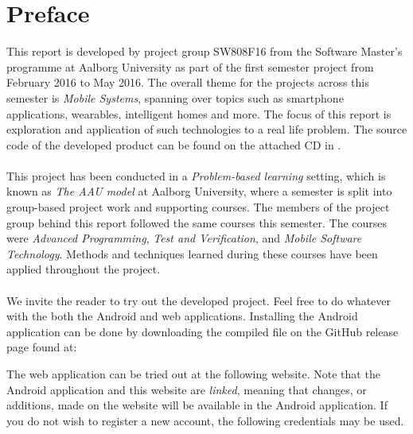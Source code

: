 
\chapter*{Preface}
This report is developed by project group SW808F16 from the Software Master's programme at Aalborg University as part of the first semester project from February 2016 to May 2016. The overall theme for the projects across this semester is \emph{Mobile Systems}, spanning over topics such as smartphone applications, wearables, intelligent homes and more. The focus of this report is exploration and application of such technologies to a real life problem. The source code of the developed product can be found on the attached CD in .
\\\\
This project has been conducted in a \emph{Problem-based learning} setting, which is known as \emph{The AAU model} at Aalborg University, where a semester is split into group-based project work and supporting courses. The members of the project group behind this report followed the same courses this semester. The courses were \emph{Advanced Programming}, \emph{Test and Verification}, and \emph{Mobile Software Technology}. Methods and techniques learned during these courses have been applied throughout the project.
\\\\
We invite the reader to try out the developed project. Feel free to do whatever with the both the Android and web applications. Installing the Android application can be done by downloading the compiled  file on the GitHub release page found at:

\begin{center}
\end{center}

The web application can be tried out at the following website. Note that the Android application and this website are \emph{linked}, meaning that changes, or additions, made on the website will be available in the Android application. If you do not wish to register a new account, the following credentials may be used.

\begin{center}
\end{center} 

